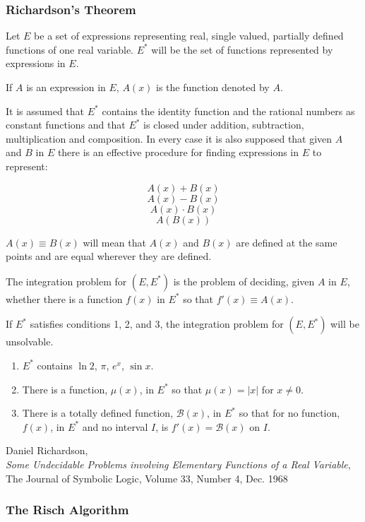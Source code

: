 \documentclass{beamer}
\begin{document}
\begin{frame}
\frametitle{Richardson's Theorem}
\begin{mdframed}[backgroundcolor=yellow!20]
\tiny
Let $E$ be a set of expressions representing real, single valued,
partially defined functions of one real variable. $E^*$ will be the set of functions
represented by expressions in $E$.

If $A$ is an expression in $E$, $A(x)$ is the function denoted by $A$.

It is assumed that $E^*$ contains the identity function and the rational numbers as
constant functions and that $E^*$ is closed under addition, subtraction, multiplication and composition.
In every case it is also supposed that given $A$ and $B$ in $E$
there is an effective procedure for finding expressions in $E$ to represent:

$$A(x) + B(x)$$
$$A(x) - B(x)$$
$$A(x) \cdot B(x)$$
$$A(B(x))$$

$A(x) \equiv B(x)$ will mean that $A(x)$ and $B(x)$ are defined at the same points and are equal wherever they are defined.

The integration problem for $(E, E^*)$ is the problem of deciding, given $A$ in $E$,
whether there is a function $f(x)$ in $E^*$ so that $f'(x) \equiv A(x)$.

If $E^*$ satisfies conditions 1, 2, and 3, the integration problem for $(E, E^*)$ will be unsolvable.
\begin{enumerate}
\item $E^*$ contains $\ln 2$, $\pi$, $e^x$, $\sin x$.
\item There is a function, $\mu(x)$, in $E^*$ so that $\mu(x)= |x|$ for $x \ne 0$.
\item There is a totally defined function, $\mathcal{B}(x)$, in $E^*$ so that for no function, $f(x)$,
in $E^*$ and no interval $I$, is $f'(x) = \mathcal{B}(x)$ on $I$.
\end{enumerate}
Daniel Richardson,\\
{\it Some Undecidable Problems involving Elementary Functions of a Real Variable},
\\
The Journal of Symbolic Logic, Volume 33, Number 4, Dec. 1968

\end{mdframed}
\end{frame}

\begin{frame}
\frametitle{The Risch Algorithm}
\end{frame}
\end{document}

